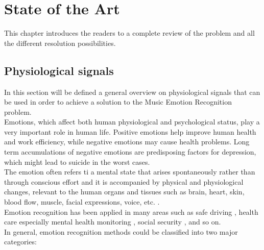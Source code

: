 \chapter{State of the Art}
\label{chap:StateOfTheArt}
\pagestyle{plain}
\vspace{0.5cm}

\noindent This chapter introduces the readers to a complete review of the problem and all the different resolution possibilities.

\section{Physiological signals}
In this section will be defined a general overview on physiological signals that can be used in order to achieve a solution to the Music Emotion Recognition problem.
\\ \indent
Emotions, which affect both human physiological and psychological status, play a very important role in human life. Positive emotions help improve human health and work efficiency, while negative emotions may cause health problems. Long term accumulations of negative emotions are predisposing factors for depression, which might lead to suicide in the worst cases.
\\
The emotion often refers ti a mental state that arises spontaneously rather than through conscious effort and it is accompanied by physical and physiological changes, relevant to the human organs and tissues such as brain, heart, skin, blood flow, muscle, facial expressions, voice, etc. \cite{shu2018review}.
\\ \indent
Emotion recognition has been applied in many areas such as safe driving \cite{de2016enhancing}, health care especially mental health monitoring \cite{guo2013pervasive}, social security \cite{verschuere2006psychopathy}, and so on.
\\
In general, emotion recognition methods could be classified into two major categories:
